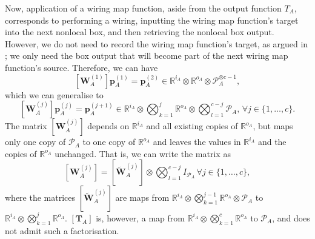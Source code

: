 \documentclass[10pt, a4paper]{article}
\numberwithin{equation}{section} %
\theoremstyle{definition}
\theoremstyle{plain}
\newcommand{\dintv}[2]{\mathopen\{#1,\ldots,#2\mathclose\}}
\newcommand{\?}{\mathrel{?}} %
\newcommand{\R}{\mathbb{R}} %
\newcommand{\cvec}[1]{\boldsymbol{\mathbf{#1}}}    %
\newcommand{\matr}[2][]{\left[\mathbf{#2}#1\right]} %
\newcommand{\sP}{\mathcal{P}}
\begin{document}
              Now, application of a wiring map function, aside from the output function \(T_A\), corresponds to performing a wiring, inputting the wiring map function's target into the next nonlocal box, and then retrieving the nonlocal box output. However, we do not need to record the wiring map function's target, as argued in ; we only need the box output that will become part of the next wiring map function's source. Therefore, we can have
              \[ \matr[_A^{(1)}]{W} \cvec{p}_A^{(1)} = \cvec{p}_A^{(2)} \in \R^{i_A} \otimes \R^{o_A} \otimes \sP_A^{\otimes c-1}, \]
              which we can generalise to
              \begin{equation}
                \matr[_A^{(j)}]{W} \cvec{p}_A^{(j)} = \cvec{p}_A^{(j+1)} \in \R^{i_A} \otimes \bigotimes_{k=1}^{j} \R^{o_A} \otimes \bigotimes_{l=1}^{c-j} \sP_A,\, \forall j \in \dintv{1}{c}.
              \end{equation}
              The matrix \(\matr[_A^{(j)}]{W}\) depends on \(\R^{i_A}\) and all existing copies of \(\R^{o_A}\), but maps only one copy of \(\sP_A\) to one copy of \(\R^{o_A}\) and leaves the values in \(\R^{i_A}\) and the copies of \(\R^{o_A}\) unchanged. That is, we can write the matrix as
              \begin{equation}
                \matr[_A^{(j)}]{W} = \matr[_A^{(j)}]{\tilde{W}} \otimes \bigotimes_{l=1}^{c-j} I_{\sP_A} \, \forall j \in \dintv{1}{c},
              \end{equation}
              where the matrices \(\matr[_A^{(j)}]{\tilde{W}}\) are maps from \(\R^{i_A} \otimes \bigotimes_{k=1}^{j-1} \R^{o_A} \otimes \sP_A\) to \(\R^{i_A} \otimes \bigotimes_{k=1}^{j} \R^{o_A}\). \(\matr[_A]{T}\) is, however, a map from \(\R^{i_A} \otimes \bigotimes_{k=1}^{c} \R^{o_A}\) to \(\sP_A\), and does not admit such a factorisation.
\end{document}
